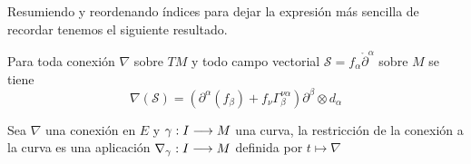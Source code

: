 Resumiendo y reordenando índices para dejar la expresión más sencilla de recordar tenemos el siguiente resultado.
\begin{proposition}
  Para toda conexión $\nabla$ sobre $TM$ y todo campo vectorial $\mathcal{S}=f_\alpha\mathring{\partial}^\alpha$
  sobre $M$ se tiene
  \begin{equation}
    \label{eq:conexion-coordenadas}
    \nabla(\mathcal{S}) = (\partial^\alpha(f_\beta)+f_\nu\Gamma_\beta^{\nu\alpha})\partial^\beta\otimes d_\alpha
  \end{equation}
\end{proposition}

Sea $\nabla$ una conexión en $E$ y $\gamma:I\longrightarrow M$ una curva, la restricción de la conexión a la curva es una
aplicación $\nabla_\gamma:I\longrightarrow M$ definida por $t\mapsto\nabla$

